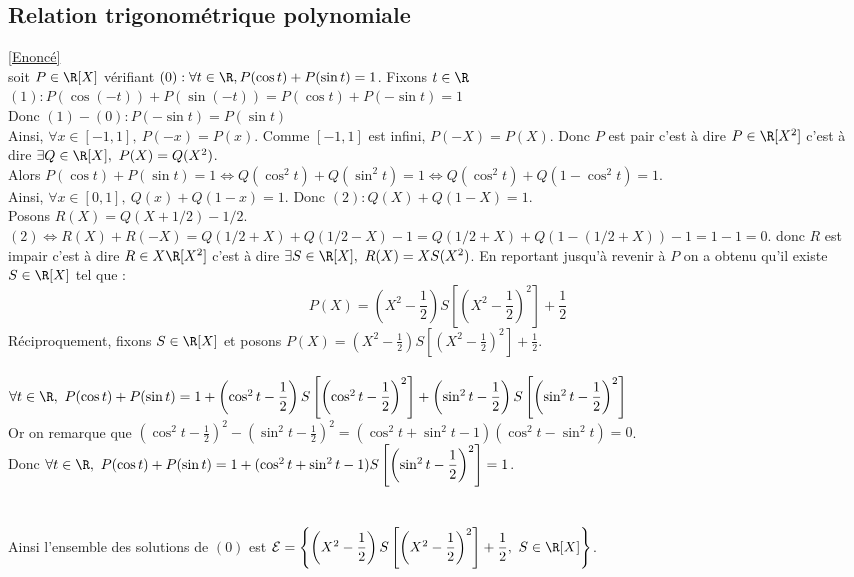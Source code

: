 \documentclass{book}
\begin{document}
	\subsection{Relation trigonométrique polynomiale }
	\label{sec:relation-trigonometrique-polynomiale-etoile3}
	\textcolor{blue}{\hyperref[relationtrigopoly]{[Enoncé]}}\\
	soit $P\in \R[X]$ vérifiant $(0):\forall t\in \R,P(\cos t)+P(\sin t)=1$. Fixons $t\in \R$\\
	$(1): P(\cos(-t))+P(\sin(-t))=P(\cos t)+P(-\sin t)=1$\\
	Donc $(1)-(0): P(-\sin t)=P(\sin t)$\\
	Ainsi, $\forall x\in [-1,1],\ P(-x)=P(x)$. Comme $[-1,1]$ est infini, $P(-X)=P(X)$. Donc $P$ est pair c'est à dire $P\in \R[X^2]$ c'est à dire $\exists Q\in \R[X],\ P(X)=Q(X^2)$.\\
	Alors $P(\cos t)+P(\sin t)=1\iff Q(\cos^2 t)+Q(\sin^2 t)=1\iff Q(\cos^2 t)+Q(1-\cos^2 t)=1$.\\
	Ainsi, $\forall x\in [0,1],\ Q(x)+Q(1-x)=1$. Donc $(2): Q(X)+Q(1-X)=1$.\\
	Posons $R(X)=Q(X+1/2)-1/2$.\\
	$(2)\iff R(X)+R(-X)=Q(1/2+X)+Q(1/2-X)-1=Q(1/2+X)+Q(1-(1/2+X))-1=1-1=0$. donc $R$ est impair c'est à dire $R\in X\R[X^2]$ c'est à dire $\exists S\in \R[X],\ R(X)=XS(X^2)$.
	En reportant jusqu'à revenir à $P$ on a obtenu qu'il existe $S\in \R[X]$ tel que :
	$$P(X)=\left(X^2-\displaystyle\frac{1}{2}\right)S\left[\left(X^2-\displaystyle\frac{1}{2}\right)^2\right]+\displaystyle\frac{1}{2}$$
	Réciproquement, fixons $S\in \R[X]$ et posons $P(X)=\left(X^2-\displaystyle\frac{1}{2}\right)S\left[\left(X^2-\displaystyle\frac{1}{2}\right)^2\right]+\displaystyle\frac{1}{2}$.\\\\
	$\forall t\in \R,\ P(\cos t)+P(\sin t)=1+\left(\cos^2 t-\displaystyle\frac{1}{2}\right)S\left[\left(\cos^2 t-\displaystyle\frac{1}{2}\right)^2\right]+\left(\sin^2 t-\displaystyle\frac{1}{2}\right)S\left[\left(\sin^2 t-\displaystyle\frac{1}{2}\right)^2\right]$\\
	Or on remarque que $\left(\cos^2 t-\displaystyle\frac{1}{2}\right)^2-\left(\sin^2 t-\displaystyle\frac{1}{2}\right)^2=(\cos^2 t+\sin^2 t-1)(\cos^2 t-\sin^2 t)=0$.\\
	Donc $\forall t\in \R,\ P(\cos t)+P(\sin t)=1+(\cos^2 t+\sin^2 t-1)S\left[\left(\sin^2 t-\displaystyle\frac{1}{2}\right)^2\right]=1$.\\\\\\
	Ainsi l'ensemble des solutions de $(0)$ est $\mathcal{E}=\left\{\left(X^2-\displaystyle\frac{1}{2}\right)S\left[\left(X^2-\displaystyle\frac{1}{2}\right)^2\right]+\displaystyle\frac{1}{2},\ S\in \R[X]\right\}$.
	
\end{document}
